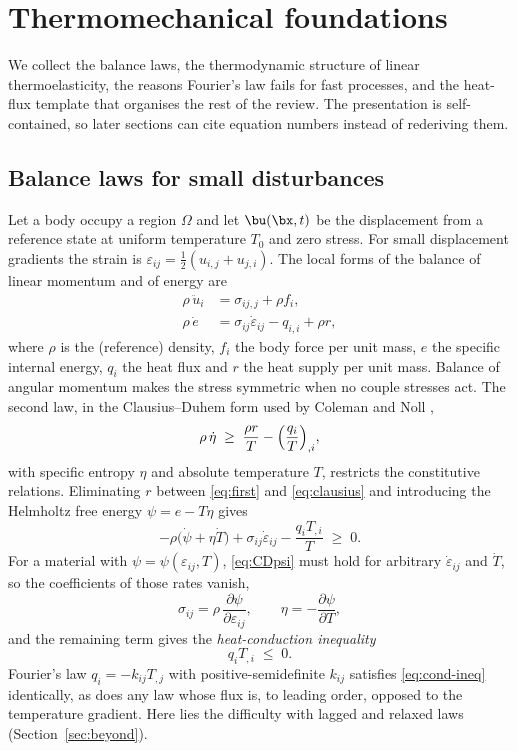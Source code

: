 \section{Thermomechanical foundations}\label{sec:foundations}
We collect the balance laws, the thermodynamic structure of linear thermoelasticity, the reasons Fourier's law fails for fast processes, and the heat-flux template that organises the rest of the review. The presentation is self-contained, so later sections can cite equation numbers instead of rederiving them.

\subsection{Balance laws for small disturbances}
Let a body occupy a region $\Omega$ and let $\bu(\bx,t)$ be the displacement from a reference state at uniform temperature $T_0$ and zero stress. For small displacement gradients the strain is $\varepsilon_{ij}=\tfrac12(u_{i,j}+u_{j,i})$. The local forms of the balance of linear momentum and of energy are
\begin{align}
\rho\,\ddot u_i &= \sigma_{ij,j}+\rho f_i, \label{eq:mom}\\
\rho\,\dot e &= \sigma_{ij}\dot\varepsilon_{ij}-q_{i,i}+\rho r, \label{eq:first}
\end{align}
where $\rho$ is the (reference) density, $f_i$ the body force per unit mass, $e$ the specific internal energy, $q_i$ the heat flux and $r$ the heat supply per unit mass. Balance of angular momentum makes the stress symmetric when no couple stresses act. The second law, in the Clausius--Duhem form used by Coleman and Noll \citep{Coleman1963},
\begin{equation}
\rho\,\dot\eta \;\ge\; \frac{\rho r}{T}-\Bigl(\frac{q_i}{T}\Bigr)_{,i}, \label{eq:clausius}
\end{equation}
with specific entropy $\eta$ and absolute temperature $T$, restricts the constitutive relations. Eliminating $r$ between \eqref{eq:first} and \eqref{eq:clausius} and introducing the Helmholtz free energy $\psi=e-T\eta$ gives
\begin{equation}
-\rho\bigl(\dot\psi+\eta\dot T\bigr)+\sigma_{ij}\dot\varepsilon_{ij}-\frac{q_i T_{,i}}{T}\;\ge\;0. \label{eq:CDpsi}
\end{equation}
For a material with $\psi=\psi(\varepsilon_{ij},T)$, \eqref{eq:CDpsi} must hold for arbitrary $\dot\varepsilon_{ij}$ and $\dot T$, so the coefficients of those rates vanish,
\begin{equation}
\sigma_{ij}=\rho\,\frac{\partial\psi}{\partial\varepsilon_{ij}},\qquad \eta=-\frac{\partial\psi}{\partial T},\label{eq:coleman}
\end{equation}
and the remaining term gives the \emph{heat-conduction inequality}
\begin{equation}
q_iT_{,i}\;\le\;0.\label{eq:cond-ineq}
\end{equation}
Fourier's law $q_i=-k_{ij}T_{,j}$ with positive-semidefinite $k_{ij}$ satisfies \eqref{eq:cond-ineq} identically, as does any law whose flux is, to leading order, opposed to the temperature gradient. Here lies the difficulty with lagged and relaxed laws (Section~\ref{sec:beyond}).

